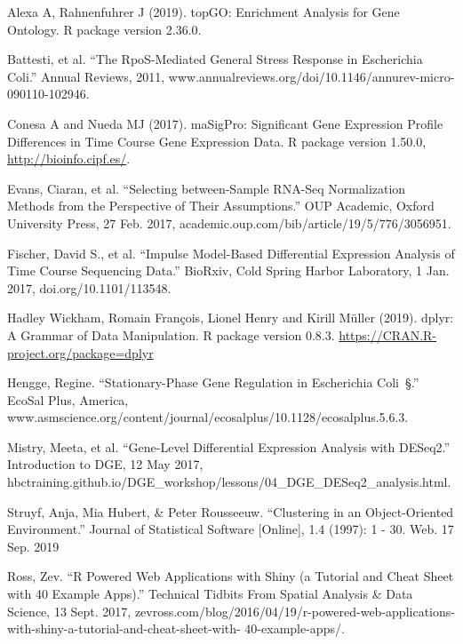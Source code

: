 \documentclass[]{article}
\begin{document}
Alexa A, Rahnenfuhrer J (2019). topGO: Enrichment Analysis for Gene
Ontology. R package version 2.36.0.

Battesti, et al. ``The RpoS-Mediated General Stress Response in
Escherichia Coli.'' Annual Reviews, 2011,
www.annualreviews.org/doi/10.1146/annurev-micro-090110-102946.

Conesa A and Nueda MJ (2017). maSigPro: Significant Gene Expression
Profile Differences in Time Course Gene Expression Data. R package
version 1.50.0, \url{http://bioinfo.cipf.es/}.

Evans, Ciaran, et al. ``Selecting between-Sample RNA-Seq Normalization
Methods from the Perspective of Their Assumptions.'' OUP Academic,
Oxford University Press, 27 Feb. 2017,
academic.oup.com/bib/article/19/5/776/3056951.

Fischer, David S., et al. ``Impulse Model-Based Differential Expression
Analysis of Time Course Sequencing Data.'' BioRxiv, Cold Spring Harbor
Laboratory, 1 Jan. 2017, doi.org/10.1101/113548.

Hadley Wickham, Romain François, Lionel Henry and Kirill Müller (2019).
dplyr: A Grammar of Data Manipulation. R package version 0.8.3.
\url{https://CRAN.R-project.org/package=dplyr}

Hengge, Regine. ``Stationary-Phase Gene Regulation in Escherichia
Coli~§.'' EcoSal Plus, America,
www.asmscience.org/content/journal/ecosalplus/10.1128/ecosalplus.5.6.3.

Mistry, Meeta, et al. ``Gene-Level Differential Expression Analysis with
DESeq2.'' Introduction to DGE, 12 May 2017,
hbctraining.github.io/DGE\_workshop/lessons/04\_DGE\_DESeq2\_analysis.html.

Struyf, Anja, Mia Hubert, \& Peter Rousseeuw. ``Clustering in an
Object-Oriented Environment.'' Journal of Statistical Software
{[}Online{]}, 1.4 (1997): 1 - 30. Web. 17 Sep. 2019

Ross, Zev. ``R Powered Web Applications with Shiny (a Tutorial and Cheat
Sheet with 40 Example Apps).'' Technical Tidbits From Spatial Analysis
\& Data Science, 13 Sept. 2017,
zevross.com/blog/2016/04/19/r-powered-web-applications-with-shiny-a-tutorial-and-cheat-sheet-with-
40-example-apps/.
\end{document}
